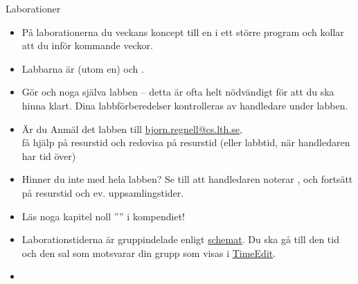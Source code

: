 \begin{SlideExtra}{Laborationer}\SlideFontSmall
\begin{itemize}
\item På laborationerna  du veckans koncept till en  i ett större program och kollar att du  inför kommande veckor.
\item Labbarna är  (utom en) och .

\item Gör  och  noga  själva labben -- detta är ofta helt nödvändigt för att du ska hinna klart. Dina labbförberedelser kontrolleras av handledare under labben.

\item Är du  Anmäl det  labben till \url{bjorn.regnell@cs.lth.se}, \\ få hjälp på resurstid och redovisa på resurstid (eller labbtid, när handledaren har tid över)

\item Hinner du inte med hela labben? Se till att handledaren noterar , och fortsätt på resurstid och ev. uppsamlingstider.

\item Läs noga kapitel noll '''' i kompendiet!

\item Laborationstiderna är gruppindelade enligt \href{http://cs.lth.se/pgk/schema/}{schemat}. Du ska gå till den tid och den sal som motsvarar din grupp som visas i \href{http://cs.lth.se/pgk/schema/timeedit/}{TimeEdit}.\\
\item {}
\end{itemize}
\end{SlideExtra}



